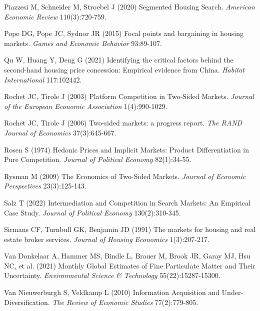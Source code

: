 \documentclass[11pt]{article}
\begin{document}
\begin{singlespace}
\begin{thebibliography}{}
Piazzesi M, Schneider M, Stroebel J (2020) Segmented Housing Search. \textit{American Economic Review} 110(3):720-759.

Pope DG, Pope JC, Sydnor JR (2015) Focal points and bargaining in housing markets. \textit{Games and Economic Behavior} 93:89-107.

Qu W, Huang Y, Deng G (2021) Identifying the critical factors behind the second-hand housing price concession: Empirical evidence from China. \textit{Habitat International} 117:102442.

Rochet JC, Tirole J (2003) Platform Competition in Two-Sided Markets. \textit{Journal of the European Economic Association} 1(4):990-1029.

Rochet JC, Tirole J (2006) Two-sided markets: a progress report. \textit{The RAND Journal of Economics} 37(3):645-667.

Rosen S (1974) Hedonic Prices and Implicit Markets: Product Differentiation in Pure Competition. \textit{Journal of Political Economy} 82(1):34-55.

Rysman M (2009) The Economics of Two-Sided Markets. \textit{Journal of Economic Perspectives} 23(3):125-143.

Salz T (2022) Intermediation and Competition in Search Markets: An Empirical Case Study. \textit{Journal of Political Economy} 130(2):310-345.

Sirmans CF, Turnbull GK, Benjamin JD (1991) The markets for housing and real estate broker services. \textit{Journal of Housing Economics} 1(3):207-217.

Van Donkelaar A, Hammer MS, Bindle L, Brauer M, Brook JR, Garay MJ, Hsu NC, et al. (2021) Monthly Global Estimates of Fine Particulate Matter and Their Uncertainty. \textit{Environmental Science \& Technology} 55(22):15287-15300.

Van Nieuwerburgh S, Veldkamp L (2010) Information Acquisition and Under-Diversification. \textit{The Review of Economic Studies} 77(2):779-805.


\end{thebibliography}
\end{singlespace}
\end{document}

